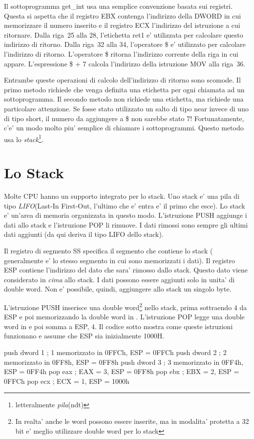 Il sottoprogramma {\code get\_int} usa una semplice convenzione basata
sui registri. Questa si aspetta che il registro EBX contenga l'indirizzo
della DWORD in cui memorizzare il numero inserito e il registro ECX
l'indirizzo del istruzione a cui ritornare. Dalla riga~25 alla 28, l'etichetta
{\code ret1} e' utilizzata per calcolare questo indirizzo di ritorno. 
Dalla riga~32 alla 34, l'operatore {\code \$} e' utilizzato per calcolare 
l'indirizzo di ritorno. L'operatore {\code \$} ritorna l'indirizzo corrente 
della riga in cui appare. L'espressione {\code \$ + 7} calcola l'indirizzo 
della istruzione {\code MOV} alla riga~36.  

Entrambe queste operazioni di calcolo dell'indirizzo di ritorno sono scomode.
Il primo metodo richiede che venga definita una etichetta per ogni chiamata
ad un sottoprogramma. Il secondo metodo non richiede una etichetta, ma richiede
una particolare attenzione. Se fosse stato utilizzato un salto di tipo near
invece di uno di tipo short, il numero da aggiungere a {\code \$} non
sarebbe stato 7! Fortunatamente, c'e' un modo molto piu' semplice di chiamare
i sottoprogrammi. Questo metodo usa lo \emph{stack}\footnote{letteralmente \emph{pila}(ndt)}.

\section{Lo Stack}

Molte CPU hanno un supporto integrato per lo stack. Uno stack e' una pila 
di tipo \emph{LIFO}(Last-In First-Out, l'ultimo che e' entra e' il primo che esce).
Lo stack e' un'area di memoria organizzata in questo modo. L'istruzione
{\code PUSH} aggiunge i dati allo stack e l'istruzione {\code POP} li 
rimuove. I dati rimossi sono sempre gli ultimi dati aggiunti (da qui deriva 
il tipo LIFO dello stack).

Il registro di segmento SS specifica il segmento che contiene lo stack (
generalmente e' lo stesso segmento in cui sono memorizzati i dati). Il
registro ESP contiene l'indirizzo del dato che sara' rimosso dallo stack.
Questo dato viene considerato in \emph{cima} allo stack. I dati possono
essere aggiunti solo in unita' di double word. Non e' possibile, quindi, 
aggiungere allo stack un singolo byte.

L'istruzione {\code PUSH} inserisce una double word\footnote{In realta' anche
le word possono essere inserite, ma in modalita' protetta a 32 bit
e' meglio utilizzare double word per lo stack} nello stack, prima 
sottraendo 4 da ESP e poi memorizzando la double word in {\code [ESP]}.
L'istruzione {\code POP} legge una double word in {\code [ESP]} e poi
somma a ESP, 4. Il codice sotto mostra come queste istruzioni funzionano
e assume che ESP sia inizialmente {\code 1000H}.
\begin{AsmCodeListing}[frame=none]
      push   dword 1    ; 1 memorizzato in 0FFCh, ESP = 0FFCh
      push   dword 2    ; 2 memorizzato in 0FF8h, ESP = 0FF8h
      push   dword 3    ; 3 memorizzato in 0FF4h, ESP = 0FF4h
      pop    eax        ; EAX = 3, ESP = 0FF8h
      pop    ebx        ; EBX = 2, ESP = 0FFCh
      pop    ecx        ; ECX = 1, ESP = 1000h
\end{AsmCodeListing}

